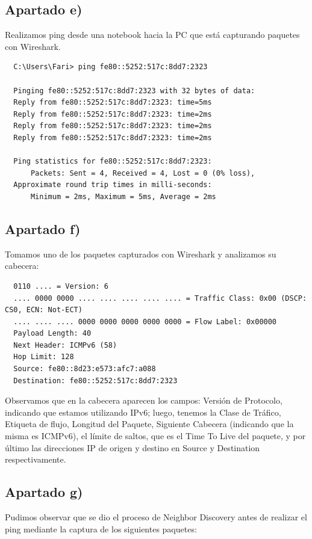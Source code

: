 \documentclass[11pt]{article}
\begin{document}
\subsection*{Apartado e)}

Realizamos ping desde una notebook hacia la PC que está capturando paquetes
con Wireshark.

\begin{verbatim}
  C:\Users\Fari> ping fe80::5252:517c:8dd7:2323

  Pinging fe80::5252:517c:8dd7:2323 with 32 bytes of data:
  Reply from fe80::5252:517c:8dd7:2323: time=5ms
  Reply from fe80::5252:517c:8dd7:2323: time=2ms
  Reply from fe80::5252:517c:8dd7:2323: time=2ms
  Reply from fe80::5252:517c:8dd7:2323: time=2ms
  
  Ping statistics for fe80::5252:517c:8dd7:2323:
      Packets: Sent = 4, Received = 4, Lost = 0 (0% loss),
  Approximate round trip times in milli-seconds:
      Minimum = 2ms, Maximum = 5ms, Average = 2ms
\end{verbatim}

\subsection*{Apartado f)}
Tomamos uno de los paquetes capturados con Wireshark y analizamos su cabecera:

\begin{verbatim}
  0110 .... = Version: 6
  .... 0000 0000 .... .... .... .... .... = Traffic Class: 0x00 (DSCP: CS0, ECN: Not-ECT)
  .... .... .... 0000 0000 0000 0000 0000 = Flow Label: 0x00000
  Payload Length: 40
  Next Header: ICMPv6 (58)
  Hop Limit: 128
  Source: fe80::8d23:e573:afc7:a088
  Destination: fe80::5252:517c:8dd7:2323
\end{verbatim}

Observamos que en la cabecera aparecen los campos: Versión de Protocolo, indicando que estamos 
utilizando IPv6; luego, tenemos la Clase de Tráfico, Etiqueta de flujo, Longitud del Paquete,
Siguiente Cabecera (indicando que la misma es ICMPv6), el límite de saltos, que es el Time
To Live del paquete, y por último las direcciones IP de origen y destino en Source y Destination
respectivamente. 

\subsection*{Apartado g)}

Pudimos observar que se dio el proceso de Neighbor Discovery antes de realizar
el ping mediante la captura de los siguientes paquetes:
\end{document}
